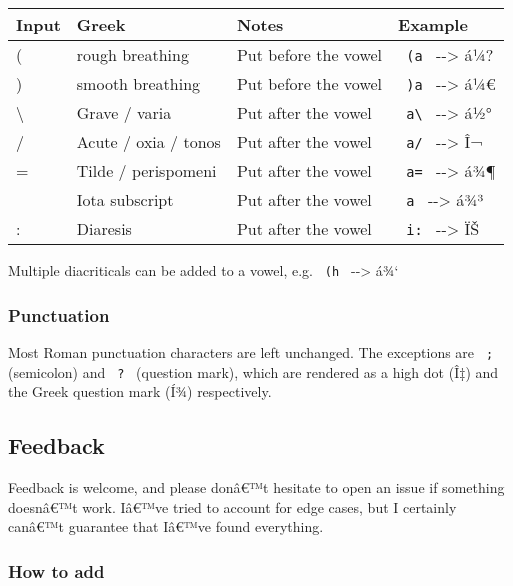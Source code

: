 \begin{longtable}[]{@{}llll@{}}
\toprule\noalign{}
Input & Greek & Notes & Example \\
\midrule\noalign{}
\endhead
\bottomrule\noalign{}
\endlastfoot
( & rough breathing & Put before the vowel & \texttt{\ (a\ }
-\/-\textgreater{} á¼? \\
) & smooth breathing & Put before the vowel & \texttt{\ )a\ }
-\/-\textgreater{} á¼€ \\
\textbackslash{} & Grave / varia & Put after the vowel &
\texttt{\ a\textbackslash{}\ } -\/-\textgreater{} á½° \\
/ & Acute / oxia / tonos & Put after the vowel & \texttt{\ a/\ }
-\/-\textgreater{} Î¬ \\
= & Tilde / perispomeni & Put after the vowel & \texttt{\ a=\ }
-\/-\textgreater{} á¾¶ \\
\textbar{} & Iota subscript & Put after the vowel &
\texttt{\ a\textbar{}\ } -\/-\textgreater{} á¾³ \\
: & Diaresis & Put after the vowel & \texttt{\ i:\ } -\/-\textgreater{}
ÏŠ \\
\end{longtable}

Multiple diacriticals can be added to a vowel, e.g.
\texttt{\ (h\textbar{}\ } -\/-\textgreater{} á¾`

\subsubsection{Punctuation}\label{punctuation}

Most Roman punctuation characters are left unchanged. The exceptions are
\texttt{\ ;\ } (semicolon) and \texttt{\ ?\ } (question mark), which are
rendered as a high dot (Î‡) and the Greek question mark (Í¾)
respectively.

\subsection{Feedback}\label{feedback}

Feedback is welcome, and please donâ€™t hesitate to open an issue if
something doesnâ€™t work. Iâ€™ve tried to account for edge cases, but I
certainly canâ€™t guarantee that Iâ€™ve found everything.

\subsubsection{How to add}\label{how-to-add}

